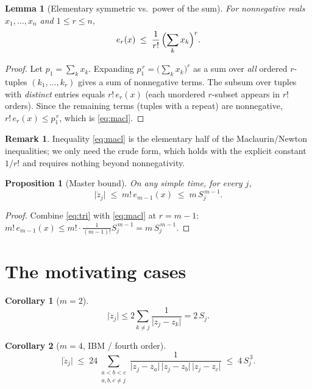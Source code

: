\documentclass[11pt]{article}
\theoremstyle{plain}
\newtheorem{proposition}{Proposition}
\newtheorem{lemma}{Lemma}
\newtheorem{corollary}{Corollary}
\theoremstyle{definition}
\newtheorem{remark}{Remark}
\newcommand{\abs}[1]{\lvert #1\rvert}
\begin{document}
\begin{lemma}[Elementary symmetric vs.\ power of the sum]\label{lem:macl}
For nonnegative reals $x_1,\dots,x_{n}$ and $1\le r\le n$,
\begin{equation}\label{eq:macl}
  e_r(x)\;\le\;\frac{1}{r!}\,\Bigl(\sum_k x_k\Bigr)^{r}.
\end{equation}
\end{lemma}

\begin{proof}
Let $p_1=\sum_k x_k$. Expanding $p_1^{\,r}=\bigl(\sum_k x_k\bigr)^r$ as a sum
over \emph{all} ordered $r$-tuples $(k_1,\dots,k_r)$ gives a sum of nonnegative
terms. The subsum over tuples with \emph{distinct} entries equals
$r!\,e_r(x)$ (each unordered $r$-subset appears in $r!$ orders). Since the
remaining terms (tuples with a repeat) are nonnegative,
$r!\,e_r(x)\le p_1^{\,r}$, which is \eqref{eq:macl}.
\end{proof}

\begin{remark}
Inequality \eqref{eq:macl} is the elementary half of the Maclaurin/Newton
inequalities; we only need the crude form, which holds with the explicit
constant $1/r!$ and requires nothing beyond nonnegativity.
\end{remark}

\begin{proposition}[Master bound]\label{prop:master}
On any simple time, for every $j$,
\begin{equation}\label{eq:master}
  \abs{\dot z_j}\;\le\;m!\,e_{m-1}(x)\;\le\;m\,S_j^{\,m-1}.
\end{equation}
\end{proposition}

\begin{proof}
Combine \eqref{eq:tri} with \eqref{eq:macl} at $r=m-1$:
$m!\,e_{m-1}(x)\le m!\cdot\frac{1}{(m-1)!}S_j^{\,m-1}=m\,S_j^{\,m-1}$.
\end{proof}

\section{The motivating cases}

\begin{corollary}[$m=2$]\label{cor:m2}
\[
  \abs{\dot z_j}\le 2\sum_{k\neq j}\frac{1}{\abs{z_j-z_k}}=2\,S_j .
\]
\end{corollary}

\begin{corollary}[$m=4$, IBM / fourth order]\label{cor:m4}
\begin{equation}\label{eq:m4}
  \abs{\dot z_j}
  \;\le\;24\!\!\sum_{\substack{a<b<c\\ a,b,c\neq j}}
        \frac{1}{\abs{z_j-z_a}\,\abs{z_j-z_b}\,\abs{z_j-z_c}}
  \;\le\;4\,S_j^{\,3}.
\end{equation}
\end{corollary}
\end{document}
